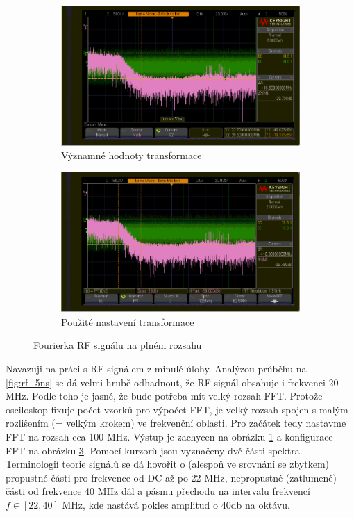 \documentclass[twoside]{article}
\begin{document}
\begin{figure}[htbp]
	\centering
	\begin{subfigure}{0.45\textwidth}
		\includegraphics[width=\linewidth]{rf_fft_amplitudy.png         }
		\caption{Významné hodnoty transformace}
		\label{fig:fft_rf}
		\end{subfigure}
	\begin{subfigure}{0.45\textwidth}
		\includegraphics[width=\linewidth]{rf_fft_resolution.png                    }
		\caption{Použité nastavení transformace}
		\label{fig:fft_rf_config}
	\end{subfigure}
	\caption{Fourierka RF signálu na plném rozsahu}
\end{figure}

Navazuji na práci s RF signálem z minulé úlohy. Analýzou průběhu na \ref{fig:rf_5ns} se dá velmi hrubě odhadnout, že RF signál obsahuje i frekvenci 20 MHz.
Podle toho je jasné, že bude potřeba mít velký rozsah FFT. Protože osciloskop fixuje počet vzorků pro výpočet FFT, je velký rozsah spojen s malým rozlišením (= velkým krokem)
ve frekvenční oblasti. Pro začátek tedy nastavme FFT na rozsah cca 100 MHz. Výstup je zachycen na obrázku \ref{fig:fft_rf} a konfigurace FFT na obrázku \ref{fig:fft_rf_config}.
Pomocí kurzorů jsou vyznačeny dvě části spektra.
Terminologií teorie signálů se dá hovořit o (alespoň ve srovnání se zbytkem) propustné části pro frekvence od DC až po 22 MHz,
nepropustné (zatlumené) části od frekvence 40 MHz dál a pásmu přechodu na intervalu frekvencí $f \in \left[ 22, 40 \right]$ MHz, kde nastává pokles amplitud o 40db na oktávu.
\end{document}
